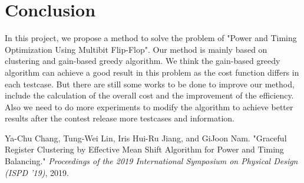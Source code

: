 \documentclass[12pt]{article}
\begin{document}
\section{Conclusion}

In this project, we propose a method to solve the problem of "Power and Timing Optimization Using Multibit Flip-Flop". Our method is mainly based on clustering and gain-based greedy algorithm. We think the gain-based greedy algorithm can achieve a good result in this problem as the cost function differs in each testcase. But there are still some works to be done to improve our method, include the calculation of the overall cost and the improvement of the efficiency. Also we need to do more experiments to modify the algorithm to achieve better results after the contest release more testcases and information.

\begin{thebibliography}{9}
    Ya-Chu Chang, Tung-Wei Lin, Iris Hui-Ru Jiang, and GiJoon Nam. "Graceful Register Clustering by Effective Mean Shift Algorithm for Power and Timing Balancing." \textit{Proceedings of the 2019 International Symposium on Physical Design (ISPD '19)}, 2019.
\end{thebibliography}
\end{document}
